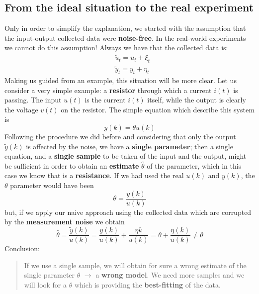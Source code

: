 \subsection{From the ideal situation to the real experiment}
Only in order to simplify the explanation, we started with the assumption that the input-output collected data were \textbf{noise-free}. In the real-world experiments we cannot do this assumption! Always we have that the collected data is:
\begin{align}
    &\tilde{u}_t = u_t+\xi_t\\
    &\tilde{y}_t = y_t+\eta_t
\end{align}
Making us guided from an example, this situation will be more clear. Let us consider a very simple  example: a \textbf{resistor} through which a current $i(t)$ is passing. The input $u(t)$ is the current $i(t)$ itself, while the output is clearly the voltage $v(t)$ on the resistor. The simple equation which describe this system is 
\begin{equation}
    y(k) = \theta u(k)
\end{equation}
Following the procedure we did before and considering that only the output $\tilde{y}(k)$ is affected by the noise, we have a \textbf{single parameter}; then a single equation, and a \textbf{single sample} to be taken of the input and the output, might be sufficient in order to obtain an \textbf{estimate} $\hat{\theta}$ of the parameter, which in this case we know that is a \textbf{resistance}.
If we had used the real $u(k)$ and $y(k)$, the $\theta$ parameter would have been
\begin{equation}
    \theta = \frac{y(k)}{u(k)}
\end{equation}
but, if we apply our naive approach using the collected data which are corrupted by the \textbf{measurement noise} we obtain
\begin{equation}
    \hat{\theta} = \frac{\tilde{y}(k)}{u(k)} = 
    \frac{y(k)}{u(k)}+\frac{\eta{k}}{u(k)} = \theta + \frac{\eta(k)}{u(k)} \ne \theta
\end{equation}
Conclusion:
\begin{quotation}
    If we use a single sample, we will obtain for sure a wrong estimate of the single parameter $\theta$ $\to$ a \textbf{wrong model}. We need more samples and we will look for a $\theta$ which is providing the \textbf{best-fitting} of the data.
\end{quotation}

